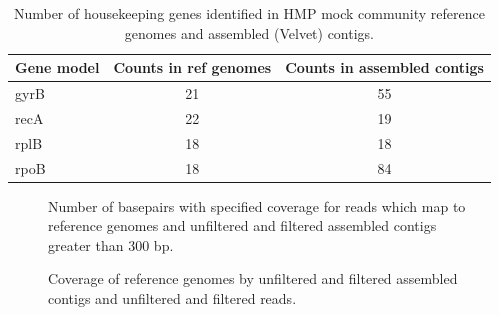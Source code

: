 \documentclass[11pt]{article} %
\begin{document}
\begin{table}[ht]
\caption{Number of housekeeping genes identified in HMP mock community reference genomes and assembled (Velvet) contigs.}
\begin{tabular}{l c c}
Gene model & Counts in ref genomes & Counts in assembled contigs \\
\hline
gyrB & 21 & 55 \\
recA & 22 & 19 \\
rplB & 18 & 18 \\
rpoB & 18 & 84 \\
\end{tabular}
\end{table}

\begin{figure}[ht]
\caption{Number of basepairs with specified coverage for reads which map to reference genomes and unfiltered and filtered assembled contigs greater than 300 bp.}
\label{coveragehmp}
\end{figure}

\begin{figure}[ht]
\caption{Coverage of reference genomes by unfiltered and filtered assembled contigs and unfiltered and filtered reads.}
\label{coverage1}
\end{figure}
\end{document}
